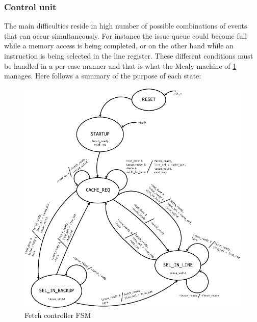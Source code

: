 \subsubsection{Control unit}
The main difficulties reside in high number of possible combinations of events that can occur simultaneously. For instance the issue queue could become full while a memory access is being completed, or on the other hand while an instruction is being selected in the line register. These different conditions must be handled in a per-case manner and that is what the Mealy machine of \cref{fig:fetch_controller_fsm} manages. Here follows a summary of the purpose of each state:
\begin{figure}[hbt]
  \centering
  \includegraphics[width=\textwidth]{img/fetch_controller_fsm.pdf}
  \caption{Fetch controller \acs{FSM}}
  \label{fig:fetch_controller_fsm}
\end{figure}
